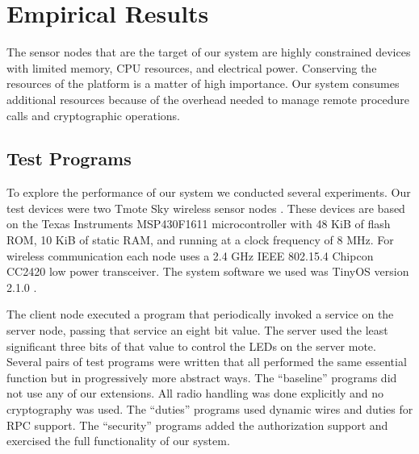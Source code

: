 
%
%
%


\section{Empirical Results}
\label{section-empirical-results}

The sensor nodes that are the target of our system are highly constrained devices with limited
memory, CPU resources, and electrical power. Conserving the resources of the platform is a
matter of high importance. Our system consumes additional resources because of the overhead
needed to manage remote procedure calls and cryptographic operations.

\subsection{Test Programs}

To explore the performance of our system we conducted several experiments. Our test devices were
two Tmote Sky wireless sensor nodes \cite{tmotesky-datasheet}. These devices are based on the
Texas Instruments MSP430F1611 microcontroller \cite{msp430-datasheet} with 48 KiB of flash ROM,
10 KiB of static RAM, and running at a clock frequency of 8 MHz. For wireless communication each
node uses a 2.4 GHz IEEE 802.15.4 Chipcon CC2420 \cite{cc2420-datasheet} low power transceiver.
The system software we used was TinyOS version 2.1.0 \cite{tinyos}.

The client node executed a program that periodically invoked a service on the server node,
passing that service an eight bit value. The server used the least significant three bits of
that value to control the LEDs on the server mote. Several pairs of test programs were written
that all performed the same essential function but in progressively more abstract ways. The
``baseline'' programs did not use any of our extensions. All radio handling was done explicitly
and no cryptography was used. The ``duties'' programs used dynamic wires and duties for RPC
support. The ``security'' programs added the authorization support and exercised the full
functionality of our system.

